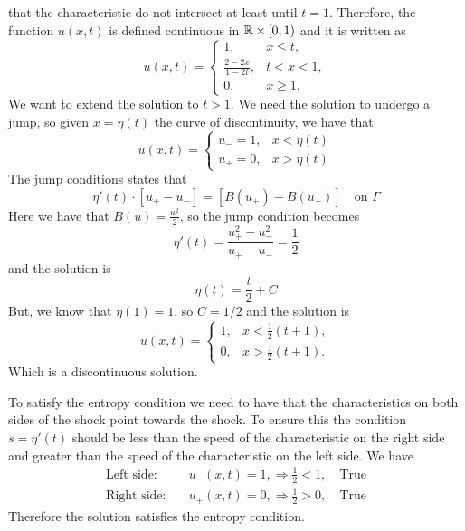 that the characteristic do not intersect at least until \(t=1\). 
Therefore, the function \(u(x,t)\) is defined continuous in \(\mathbb{R} \times [0, 1)\) and it is written as
\[
    u(x,t) = \begin{cases}
        1, & x \leq t, \\
        \frac{2-2x}{1-2t}, & t < x < 1, \\
        0, & x \geq 1.
    \end{cases}
\]
We want to extend the solution to \(t > 1\). We need the solution to undergo a jump, so given \(x = \eta(t)\) the curve of discontinuity, we have that
\[
    u(x, t) = \begin{cases}
        u_- = 1, & x < \eta(t) \\ 
        u_+ = 0, & x > \eta(t)
    \end{cases}
\]
The jump conditions states that
\[
    \eta'(t) \cdot \left[u_+ - u_-\right] = \left[B(u_+) - B(u_-)\right] \quad \text{on } \Gamma
\]
Here we have that \(B(u) = \frac{u^2}{2}\), so the jump condition becomes
\[
    \eta'(t) = \frac{u_+^2 - u_-^2}{u_+ - u_-} = \frac{1}{2}
\]
and the solution is
\[
    \eta(t) = \frac{t}{2} + C
\]
But, we know that \(\eta(1) = 1\), so \(C = 1/2\) and the solution is
\[
    u(x,t) = \begin{cases}
        1, & x < \frac{1}{2}(t+1), \\
        0, & x > \frac{1}{2}(t+1).  
    \end{cases}
\]
Which is a discontinuous solution. 

To satisfy the entropy condition we need to have that the characteristics on both sides of the shock point towards the shock. To ensure this the condition \(s = \eta'(t)\) should be less than the speed of the characteristic on the right side and greater than the speed of the characteristic on the left side. We have
\begin{align*}
    \text{Left side:} & \quad u_-(x,t) = 1, \Rightarrow \frac{1}{2} < 1, \quad \text{True} \\
    \text{Right side:} & \quad u_+(x,t) = 0, \Rightarrow \frac{1}{2} > 0, \quad \text{True} 
\end{align*}
Therefore the solution satisfies the entropy condition.

